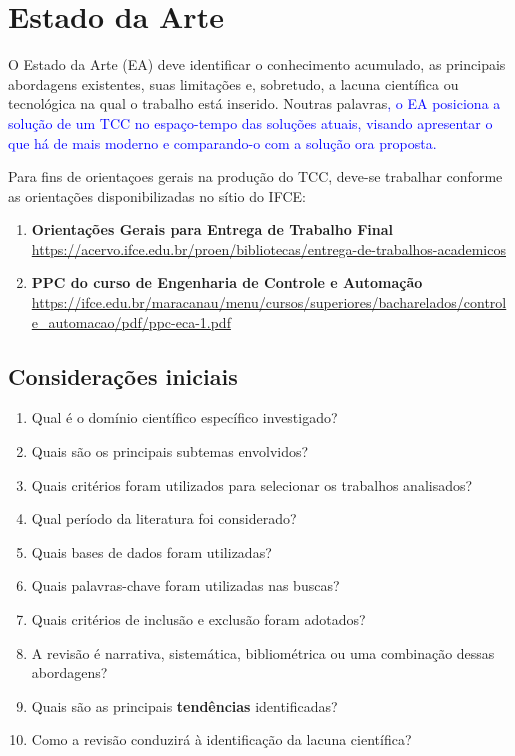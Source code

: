 \chapter{Estado da Arte}

O Estado da Arte (EA) deve identificar o conhecimento acumulado, as principais abordagens existentes, suas limitações e, sobretudo, a lacuna científica ou tecnológica na qual o trabalho está inserido.
Noutras palavras\textcolor{blue}{, o EA posiciona a solução de um TCC no espaço-tempo das soluções atuais, visando apresentar o que há de mais moderno e comparando-o com a solução ora proposta. }

Para fins de orientaçoes gerais na produção do TCC, deve-se trabalhar conforme as orientações disponibilizadas no sítio do IFCE:
\begin{enumerate}
    \item \textbf{Orientações Gerais para Entrega de Trabalho Final} \\ \url{https://acervo.ifce.edu.br/proen/bibliotecas/entrega-de-trabalhos-academicos}
    
    \item \textbf{PPC do curso de Engenharia de Controle e Automação}\\ \url{https://ifce.edu.br/maracanau/menu/cursos/superiores/bacharelados/controle_automacao/pdf/ppc-eca-1.pdf}
    
\end{enumerate}


\section{Considerações iniciais}

\begin{enumerate}
	\item Qual é o domínio científico específico investigado?
	\item Quais são os principais subtemas envolvidos?
	\item Quais critérios foram utilizados para selecionar os trabalhos analisados?
	\item Qual período da literatura foi considerado?
	\item Quais bases de dados foram utilizadas?
	\item Quais palavras-chave foram utilizadas nas buscas?
	\item Quais critérios de inclusão e exclusão foram adotados?
	\item A revisão é narrativa, sistemática, bibliométrica ou uma combinação dessas abordagens?
	\item Quais são as principais \textbf{tendências} identificadas?
	\item Como a revisão conduzirá à identificação da lacuna científica?
\end{enumerate}

